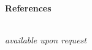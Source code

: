\documentclass[letterpaper,11pt]{article}
\begin{document}

\begin{Large}\textbf{\\References}\end{Large}

\textit{\\available upon request}

\end{document}
